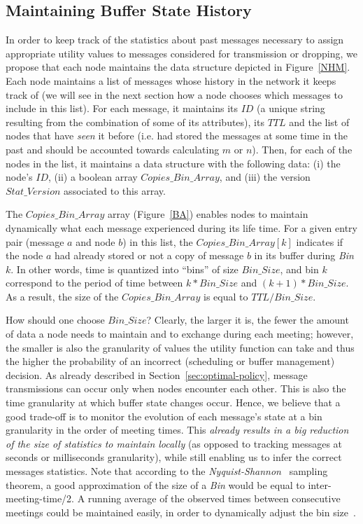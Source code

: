 \subsection{Maintaining Buffer State History}
\label{NetworkHistoryModel}

In order to keep track of the statistics about past messages necessary to assign appropriate utility values to messages considered for transmission or dropping, we propose that each node maintains the data structure depicted in Figure~\ref{NHM}. Each node maintains a list of messages whose history in the network it keeps track of (we will see in the next section how a node chooses which messages to include in this list). For each message, it maintains its $ID$ (a unique string resulting from the combination of some of its attributes), its $TTL$ and the list of nodes that have \emph{seen} it before (i.e. had stored the messages at some time in the past and should be accounted towards calculating $m$ or $n$). Then, for each of the nodes in the list, it maintains a data structure with the following data: (i) the node's $ID$, (ii) a boolean array $Copies\_Bin\_Array$, and (iii) the version $Stat\_Version$ associated to this array.

The $Copies\_Bin\_Array$ array (Figure~\ref{BA}) enables nodes to maintain dynamically what each message experienced during its life time. For a given entry pair (message $a$ and node $b$) in this list, the $Copies\_Bin\_Array[k]$ indicates if the node $a$ had already stored or not a copy of message $b$ in its buffer during \emph{Bin} $k$. In other words, time is quantized into ``bins'' of size $Bin\_Size$, and bin $k$ correspond to the period of time between $k*Bin\_Size$ and $(k+1)*Bin\_Size$. As a result, the size of the $Copies\_Bin\_Array$ is equal to $TTL/Bin\_Size$.

How should one choose $Bin\_Size$? Clearly, the larger it is, the fewer the amount of data a node needs to maintain and to exchange during each meeting; however, the smaller is also the granularity of values the utility function can take and thus the higher the probability of an incorrect (scheduling or buffer management) decision. As already described in Section~\ref{sec:optimal-policy}, message transmissions can occur only when nodes encounter each other. This is also the time granularity at which buffer state changes occur. Hence, we believe that a good trade-off is to monitor the evolution of each message's state at a bin granularity in the order of meeting times. This \emph{already results in a big reduction of the size of statistics to maintain locally} (as opposed to tracking messages at seconds or milliseconds granularity), while still enabling us to infer the correct messages statistics. Note that  according to the \emph{Nyquist-Shannon}~\cite{Nyquist} sampling theorem, a good approximation of the size of a \emph{Bin} would be equal to inter-meeting-time/2. A running average of the observed times between consecutive meetings could be maintained easily, in order to dynamically adjust the bin size~\cite{akis:ton-multi}. 

